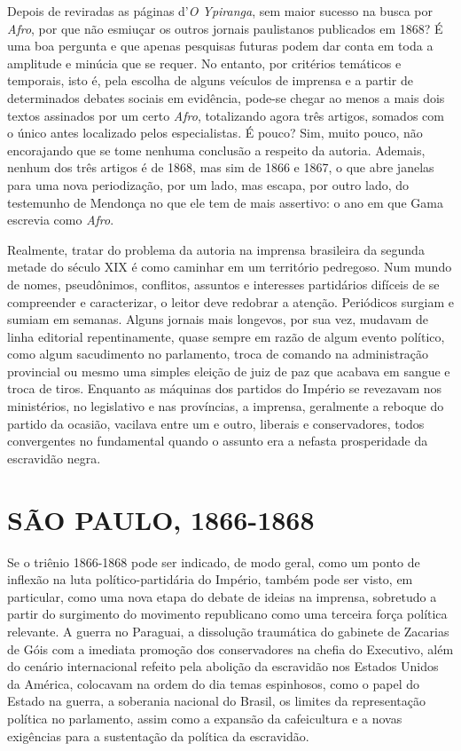 Depois de reviradas as páginas d'\emph{O Ypiranga}, sem maior sucesso na
busca por \emph{Afro}, por que não esmiuçar os outros jornais
paulistanos publicados em 1868? É uma boa pergunta e que apenas
pesquisas futuras podem dar conta em toda a amplitude e minúcia que se
requer. No entanto, por critérios temáticos e temporais, isto é, pela
escolha de alguns veículos de imprensa e a partir de determinados
debates sociais em evidência, pode-se chegar ao menos a mais dois textos
assinados por um certo \emph{Afro}, totalizando agora três artigos,
somados com o único antes localizado pelos especialistas. É pouco? Sim,
muito pouco, não encorajando que se tome nenhuma conclusão a respeito da
autoria. Ademais, nenhum dos três artigos é de 1868, mas sim de 1866 e
1867, o que abre janelas para uma nova periodização, por um lado, mas
escapa, por outro lado, do testemunho de Mendonça no que ele tem de mais
assertivo: o ano em que Gama escrevia como \emph{Afro}.

Realmente, tratar do problema da autoria na imprensa brasileira da
segunda metade do século XIX é como caminhar em um território pedregoso.
Num mundo de nomes, pseudônimos, conflitos, assuntos e interesses
partidários difíceis de se compreender e caracterizar, o leitor deve
redobrar a atenção. Periódicos surgiam e sumiam em semanas. Alguns
jornais mais longevos, por sua vez, mudavam de linha editorial
repentinamente, quase sempre em razão de algum evento político, como
algum sacudimento no parlamento, troca de comando na administração
provincial ou mesmo uma simples eleição de juiz de paz que acabava em
sangue e troca de tiros. Enquanto as máquinas dos partidos do Império se
revezavam nos ministérios, no legislativo e nas províncias, a imprensa,
geralmente a reboque do partido da ocasião, vacilava entre um e outro,
liberais e conservadores, todos convergentes no fundamental quando o
assunto era a nefasta prosperidade da escravidão negra.

\section{SÃO PAULO, 1866-1868}

Se o triênio 1866-1868 pode ser indicado, de modo geral, como um ponto
de inflexão na luta político-partidária do Império, também pode ser
visto, em particular, como uma nova etapa do debate de ideias na
imprensa, sobretudo a partir do surgimento do movimento republicano como
uma terceira força política relevante. A guerra no Paraguai, a
dissolução traumática do gabinete de Zacarias de Góis com a imediata
promoção dos conservadores na chefia do Executivo, além do cenário
internacional refeito pela abolição da escravidão nos Estados Unidos da
América, colocavam na ordem do dia temas espinhosos, como o papel do
Estado na guerra, a soberania nacional do Brasil, os limites da
representação política no parlamento, assim como a expansão da
cafeicultura e a novas exigências para a sustentação da política da
escravidão.


